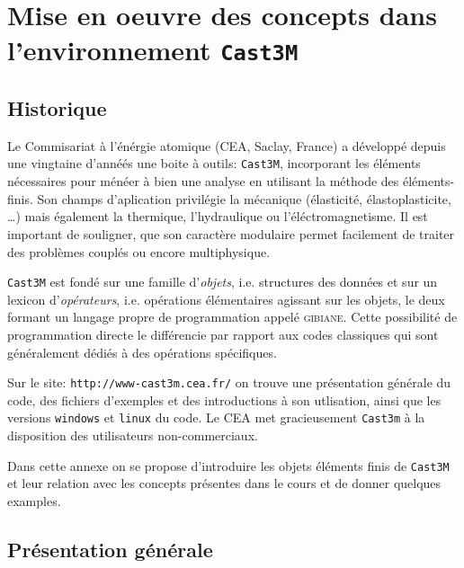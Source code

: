 \chapter{Mise en oeuvre des concepts dans l'environnement \texttt{Cast3M}}

\section{Historique}

Le Commisariat à l'énérgie atomique (CEA, Saclay, France) a développé depuis une vingtaine 
d'annéés une boite à outils: \texttt{Cast3M}, incorporant les éléments nécessaires pour ménéer à bien 
une analyse en utilisant la méthode des éléments-finis. Son champs d'aplication privilégie 
la mécanique (élasticité, élastoplasticite, \ldots) mais également la thermique, l'hydraulique 
ou l'éléctromagnetisme. Il est important de souligner, que son caractère modulaire permet facilement 
de traiter des problèmes couplés ou encore multiphysique. 

\texttt{Cast3M} est fondé sur une famille d'\textit{objets}, i.e. 
structures des données et sur un lexicon d'\textit{opérateurs}, i.e. opérations élémentaires 
agissant sur les objets, le deux formant un langage propre de programmation appelé \textsc{gibiane}. 
Cette possibilité de programmation directe le différencie par 
rapport aux codes classiques qui sont généralement 
dédiés à des opérations spécifiques. 

Sur le site: \texttt{http://www-cast3m.cea.fr/} on trouve une présentation générale du code, 
des fichiers d'exemples et des introductions à son utlisation, ainsi que les versions 
\texttt{windows} et \texttt{linux} du code. Le CEA met gracieusement \texttt{Cast3m} à la disposition 
des utilisateurs non-commerciaux. 

Dans cette annexe on se propose d'introduire les objets éléments finis de \texttt{Cast3M} et 
leur relation avec les concepts présentes dans le cours et de donner quelques examples. 

\section{Présentation générale}

